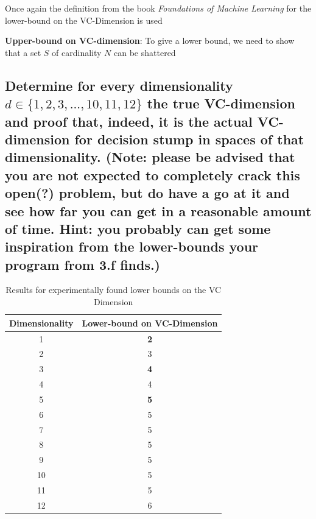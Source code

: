 \documentclass[11pt,a4paper]{article}
\begin{document}
Once again the definition from the book \textit{Foundations of Machine Learning} \cite{foundations_of_machine_learning} for the lower-bound on the VC-Dimension is used

\textbf{Upper-bound on VC-dimension}: To give a lower bound, we need to show that a set $S$ of cardinality $N$ can be shattered

\subsection{Determine for every dimensionality $d ∈ \{1, 2, 3, . . . , 10, 11, 12\}$ the true VC-dimension and proof that, indeed, it is the actual VC-dimension for decision stump in spaces of that dimensionality. (Note: please be advised that you are not expected to completely crack this open(?) problem, but do have a go at it and see how far you can get in a reasonable amount of time. Hint: you probably can get some inspiration from the lower-bounds your program from 3.f finds.)}
\label{sec:2e}

\begin{table}
    \begin{tabular}{|c|c|}
    \hline
    Dimensionality & Lower-bound on VC-Dimension \\ \hline
    1              & \textbf{2}                            \\ \hline
    2              & 3                            \\ \hline
    3              & \textbf{4}                            \\ \hline
    4              & 4                            \\ \hline
    5              & \textbf{5}                            \\ \hline
    6              &    5                         \\ \hline
    7              & 5                           \\ \hline
    8              & 5                            \\ \hline
    9              & 5                            \\ \hline
    10              & 5                            \\ \hline
    11             &  5                          \\ \hline
    12              &  6                           \\ \hline
    \end{tabular}
    \caption{Results for experimentally found lower bounds on the VC Dimension}
    \label{tab:upper-bound-vc}
\end{table}




\end{document}
